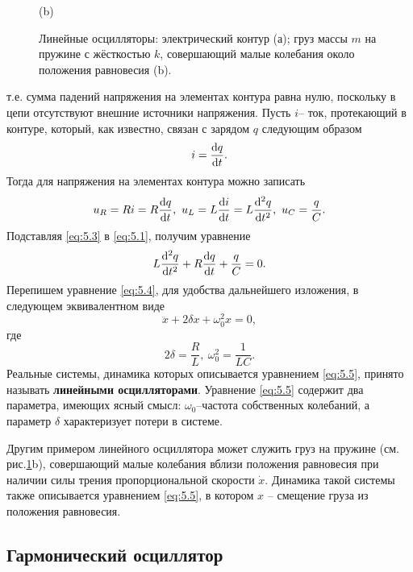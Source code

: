 \begin{figure}[h!]
\begin{minipage}{0.45\linewidth}
                (b)      
        \end{minipage}
        \caption{Линейные осцилляторы: электрический контур (а); груз массы $m$ на пружине с жёсткостью $k$, совершающий малые колебания около положения равновесия (b).}
        \label{fig:5.1}
\end{figure}
т.е. сумма падений напряжения на элементах контура равна нулю, поскольку в цепи отсутствуют внешние источники напряжения. Пусть $i$-- ток, протекающий в контуре, который, как известно, связан с зарядом $q$ следующим образом
\begin{equation}
        \label{eq:5.2}
        i = \dv{q}{t}.
\end{equation}
Тогда для напряжения на элементах контура можно записать
\begin{equation}
        \label{eq:5.3}
        u_R = Ri = R \dv{q}{t}, ~ u_L = L \dv{i}{t} = L \dv[2]{q}{t},~ u_C= \frac{q}{C}.
\end{equation}
Подставляя \eqref{eq:5.3} в \eqref{eq:5.1}, получим уравнение
\begin{equation}
        \label{eq:5.4}
        L\dv[2]{q}{t} + R \dv{q}{t} + \frac{q}{C} = 0.
\end{equation}
Перепишем уравнение \eqref{eq:5.4}, для удобства дальнейшего изложения, в следующем эквивалентном виде
\begin{equation}
        \label{eq:5.5}
        \ddot x + 2 \delta x + \omega_0^2 x =0,
\end{equation}
где 
\begin{equation}
        \label{eq:}
        2 \delta = \frac{R}{L}, ~ \omega_0^2=\frac{1}{LC}.
\end{equation}
Реальные системы, динамика которых описывается уравнением \eqref{eq:5.5}, принято называть
\textbf{линейными осцилляторами}. Уравнение \eqref{eq:5.5} содержит два параметра, имеющих ясный смысл: $\omega_0$--частота собственных колебаний, а параметр $\delta$ характеризует потери в системе.

Другим примером линейного осциллятора может служить груз на пружине (см. рис.\ref{fig:5.1}b), совершающий малые колебания вблизи положения равновесия при наличии силы трения пропорциональной скорости $\dot x$. Динамика такой системы также описывается уравнением \eqref{eq:5.5}, в котором $x$ -- смещение груза из положения равновесия.

\subsection{Гармонический осциллятор}%
\label{sub:5.1.1}

